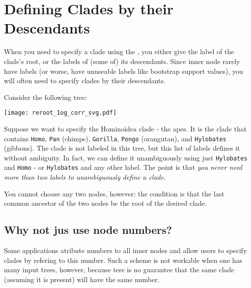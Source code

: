 \chapter{Defining Clades by their Descendants}
\label{sct_def_clades}

When you need to specify a clade using the \nutils{}, you either give the label
of the clade's root, or the labels of (some of) its descendants. Since inner
node rarely have labels (or worse, have unuseable labels like bootstrap support
		values), you will often need to specify clades by their
descendants.

Consider the following tree:

\begin{center}
\texttt{[image: reroot\_1og\_corr\_svg.pdf]} 
\end{center}

Suppose we want to specify the Hominoidea clade - the apes. It is the clade
that contains \texttt{Homo}, \texttt{Pan} (chimps), \texttt{Gorilla},
     \texttt{Pongo} (orangutan), and \texttt{Hylobates} (gibbons). The clade is
     not labeled in this tree, but this list of labels defines it without
     ambiguity. In fact, we can define it unambiguously using just
     \texttt{Hylobates} and \texttt{Homo} - or \texttt{Hylobates} and any other
     label. The point is that \emph{you never need more than two labels to
     unambiguously define a clade}.

You cannot choose any two nodes, however: the condition is that the last
common ancestor of the two nodes be the root of the desired clade.

\section{Why not jus use node numbers?}

Some applications atribute numbers to all inner nodes and allow users to specify clades by refering to this number. Such a scheme is not workable when one has many input trees, however, because tere is no guarantee that the same clade (assuming it is present) will have the same number.
